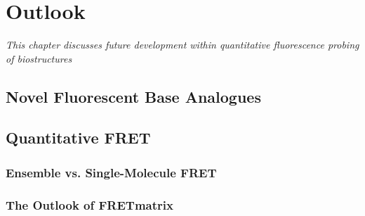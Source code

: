 \chapter{Outlook}
\label{chap:Methodologies}
\textit{This chapter discusses future development within quantitative fluorescence probing of biostructures}
\vspace{2ex}\vfill
\minitoc
\newpage

\section{Novel Fluorescent Base Analogues}


\section{Quantitative FRET}
\subsection{Ensemble vs. Single-Molecule FRET}
\subsection{The Outlook of FRETmatrix}

